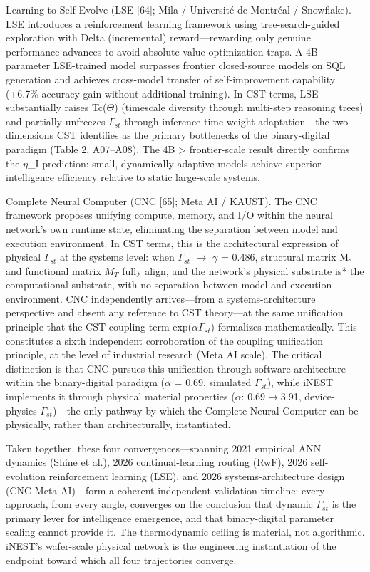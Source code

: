 \documentclass[a4paper,12pt]{article}
\begin{document}
Learning to Self-Evolve (LSE [64]; Mila / Université de Montréal / Snowflake).
LSE introduces a reinforcement learning framework using tree-search-guided exploration with Delta (incremental) reward---rewarding only genuine performance advances to avoid absolute-value optimization traps.
A 4B-parameter LSE-trained model surpasses frontier closed-source models on SQL generation and achieves cross-model transfer of self-improvement capability (+6.7\% accuracy gain without additional training).
In CST terms, LSE substantially raises Tc($\Theta$) (timescale diversity through multi-step reasoning trees) and partially unfreezes $\Gamma_{st}$ through inference-time weight adaptation---the two dimensions CST identifies as the primary bottlenecks of the binary-digital paradigm (Table 2, A07--A08).
The 4B > frontier-scale result directly confirms the $\eta$_I prediction: small, dynamically adaptive models achieve superior intelligence efficiency relative to static large-scale systems.


Complete Neural Computer (CNC [65]; Meta AI / KAUST).
The CNC framework proposes unifying compute, memory, and I/O within the neural network's own runtime state, eliminating the separation between model and execution environment.
In CST terms, this is the architectural expression of physical $\Gamma_{st}$ at the systems level: when $\Gamma_{st}$ $\rightarrow$ $\gamma$ = 0.486, structural matrix Mₛ and functional matrix $M_{T}$ fully align, and the network's physical substrate is* the computational substrate, with no separation between model and execution environment.
CNC independently arrives---from a systems-architecture perspective and absent any reference to CST theory---at the same unification principle that the CST coupling term exp($\alpha$\cdot$\Gamma_{st}$) formalizes mathematically.
This constitutes a sixth independent corroboration of the coupling unification principle, at the level of industrial research (Meta AI scale).
The critical distinction is that CNC pursues this unification through software architecture within the binary-digital paradigm ($\alpha$ = 0.69, simulated $\Gamma_{st}$), while iNEST implements it through physical material properties ($\alpha$: 0.69$\rightarrow$3.91, device-physics $\Gamma_{st}$)---the only pathway by which the Complete Neural Computer can be physically, rather than architecturally, instantiated.


Taken together, these four convergences---spanning 2021 empirical ANN dynamics (Shine et al.), 2026 continual-learning routing (RwF), 2026 self-evolution reinforcement learning (LSE), and 2026 systems-architecture design (CNC Meta AI)---form a coherent independent validation timeline: every approach, from every angle, converges on the conclusion that dynamic $\Gamma_{st}$ is the primary lever for intelligence emergence, and that binary-digital parameter scaling cannot provide it.
The thermodynamic ceiling is material, not algorithmic. iNEST's wafer-scale physical network is the engineering instantiation of the endpoint toward which all four trajectories converge.
\end{document}
